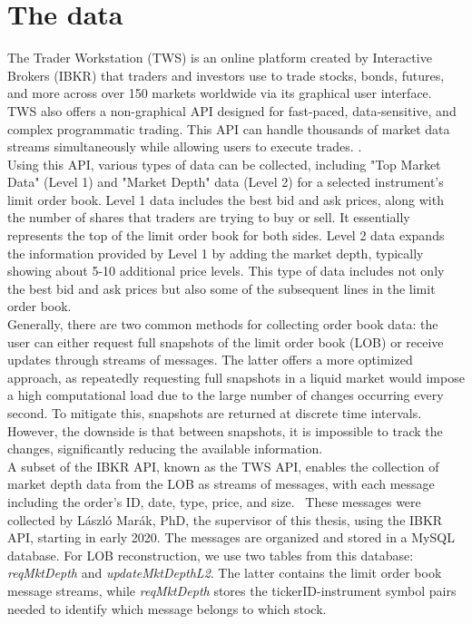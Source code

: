 \documentclass[a4paper,oneside,onecolumn,12pt]{LegrandOrangeBook}
\begin{document}
\section{The data}
The Trader Workstation (TWS) is an online platform created by Interactive Brokers (IBKR) that traders and investors use to trade stocks, bonds, futures, and more across over 150 markets worldwide via its graphical user interface. \cite{TW} TWS also offers a non-graphical API designed for fast-paced, data-sensitive, and complex programmatic trading. This API can handle thousands of market data streams simultaneously while allowing users to execute trades. \cite{IBKRAPI}.\\ 
Using this API, various types of data can be collected, including "Top Market Data" (Level 1) and "Market Depth" data (Level 2) for a selected instrument's limit order book. Level 1 data includes the best bid and ask prices, along with the number of shares that traders are trying to buy or sell. It essentially represents the top of the limit order book for both sides. \cite{IL1} Level 2 data expands the information provided by Level 1 by adding the market depth, typically showing about 5-10 additional price levels. This type of data includes not only the best bid and ask prices but also some of the subsequent lines in the limit order book. \cite{IL2}\\
Generally, there are two common methods for collecting order book data: the user can either request full snapshots of the limit order book (LOB) or receive updates through streams of messages. The latter offers a more optimized approach, as repeatedly requesting full snapshots in a liquid market would impose a high computational load due to the large number of changes occurring every second. To mitigate this, snapshots are returned at discrete time intervals. However, the downside is that between snapshots, it is impossible to track the changes, significantly reducing the available information. \cite{TLOB}\\
A subset of the IBKR API, known as the TWS API, enables the collection of market depth data from the LOB as streams of messages, with each message including the order's ID, date, type, price, and size. \cite{TWS_API_MD}\ These messages were collected by László Marák, PhD, the supervisor of this thesis, using the IBKR API, starting in early 2020. The messages are organized and stored in a MySQL database. For LOB reconstruction, we use two tables from this database: \textit{reqMktDepth} and \textit{updateMktDepthL2}. The latter contains the limit order book message streams, while \textit{reqMktDepth} stores the tickerID-instrument symbol pairs needed to identify which message belongs to which stock.\\
\end{document}
